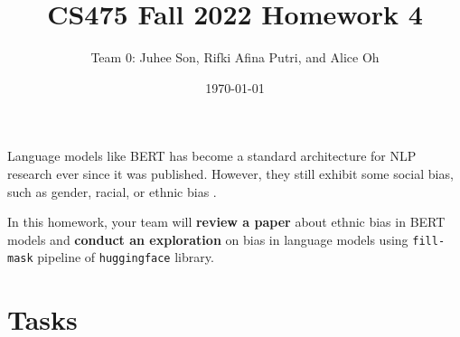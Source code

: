 \documentclass[UTF8]{article}
\title{CS475 Fall 2022 Homework 4}
\author{
  Team 0:  %
  Juhee Son, Rifki Afina Putri, and Alice Oh  %
}
\date{\today}
\begin{document}
\maketitle

Language models like BERT \cite{devlin-etal-2019-bert} has become a standard architecture for NLP research ever since it was published. However, they still exhibit some social bias, such as gender, racial, or ethnic bias \cite{ahn-oh-2021-mitigating}.

In this homework, your team will \textbf{review a paper} about ethnic bias in BERT models and \textbf{conduct an exploration} on bias in language models using \texttt{fill-mask} pipeline of \texttt{huggingface} library. 

\section{Tasks}
\end{document}
